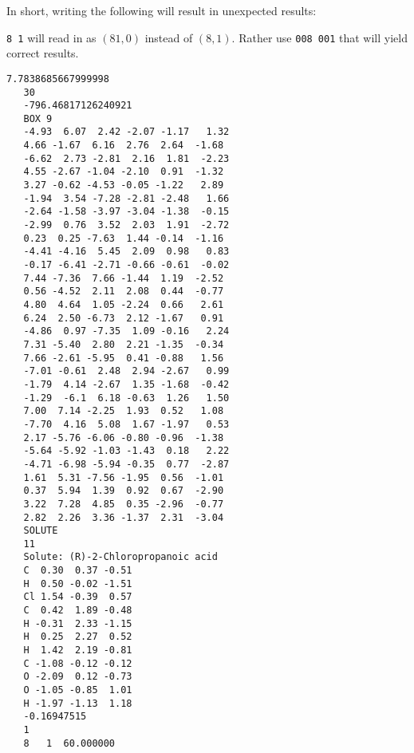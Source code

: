 In short, writing the following will result in unexpected results:

\verb|8 1| will read in as $(81, 0)$ instead of $(8, 1)$. Rather use 
\verb|008 001| that will yield correct results.

\begin{lstlisting}[caption=Example of a correct box-file]
   7.7838685667999998     
   30
   -796.46817126240921     
   BOX 9
   -4.93  6.07  2.42 -2.07 -1.17   1.32     
   4.66 -1.67  6.16  2.76  2.64  -1.68     
   -6.62  2.73 -2.81  2.16  1.81  -2.23     
   4.55 -2.67 -1.04 -2.10  0.91  -1.32     
   3.27 -0.62 -4.53 -0.05 -1.22   2.89     
   -1.94  3.54 -7.28 -2.81 -2.48   1.66     
   -2.64 -1.58 -3.97 -3.04 -1.38  -0.15     
   -2.99  0.76  3.52  2.03  1.91  -2.72     
   0.23  0.25 -7.63  1.44 -0.14  -1.16     
   -4.41 -4.16  5.45  2.09  0.98   0.83     
   -0.17 -6.41 -2.71 -0.66 -0.61  -0.02
   7.44 -7.36  7.66 -1.44  1.19  -2.52     
   0.56 -4.52  2.11  2.08  0.44  -0.77     
   4.80  4.64  1.05 -2.24  0.66   2.61     
   6.24  2.50 -6.73  2.12 -1.67   0.91     
   -4.86  0.97 -7.35  1.09 -0.16   2.24     
   7.31 -5.40  2.80  2.21 -1.35  -0.34     
   7.66 -2.61 -5.95  0.41 -0.88   1.56     
   -7.01 -0.61  2.48  2.94 -2.67   0.99     
   -1.79  4.14 -2.67  1.35 -1.68  -0.42     
   -1.29  -6.1  6.18 -0.63  1.26   1.50     
   7.00  7.14 -2.25  1.93  0.52   1.08     
   -7.70  4.16  5.08  1.67 -1.97   0.53     
   2.17 -5.76 -6.06 -0.80 -0.96  -1.38     
   -5.64 -5.92 -1.03 -1.43  0.18   2.22     
   -4.71 -6.98 -5.94 -0.35  0.77  -2.87     
   1.61  5.31 -7.56 -1.95  0.56  -1.01     
   0.37  5.94  1.39  0.92  0.67  -2.90     
   3.22  7.28  4.85  0.35 -2.96  -0.77     
   2.82  2.26  3.36 -1.37  2.31  -3.04     
   SOLUTE
   11
   Solute: (R)-2-Chloropropanoic acid
   C  0.30  0.37 -0.51
   H  0.50 -0.02 -1.51
   Cl 1.54 -0.39  0.57
   C  0.42  1.89 -0.48
   H -0.31  2.33 -1.15
   H  0.25  2.27  0.52
   H  1.42  2.19 -0.81
   C -1.08 -0.12 -0.12
   O -2.09  0.12 -0.73
   O -1.05 -0.85  1.01
   H -1.97 -1.13  1.18
   -0.16947515     
   1
   8   1  60.000000

\end{lstlisting}